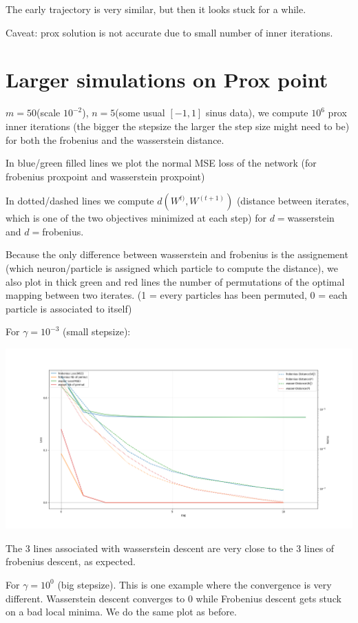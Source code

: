 The early trajectory is very similar, but then it looks stuck for a while.

Caveat: prox solution is not accurate due to small number of inner iterations.

\section{Larger simulations on Prox point}

$m = 50$(scale $10^{-2}$), $n = 5$(some usual $[-1, 1]$ sinus data), we compute $10^6$ prox inner iterations (the bigger the stepsize the larger the step size might need to be) for both the frobenius and the wasserstein distance. 

In blue/green filled lines we plot the normal MSE loss of the network (for frobenius proxpoint and wasserstein proxpoint)

In dotted/dashed lines we compute $d(W^{t)}, W^{(t+1)})$ (distance between iterates, which is one of the two objectives minimized at each step) for $d=$wasserstein and $d=$frobenius.

Because the only difference between wasserstein and frobenius is the assignement (which neuron/particle is assigned which particle to compute the distance), we also plot in thick green and red lines the number of permutations of the optimal mapping between two iterates. (1 = every particles has been permuted, 0 = each particle is associated to itself)

For $\gamma = 10^{-3}$ (small stepsize):

\includegraphics[width=1.0\textwidth]{imgs/petit_pas_10steps.png}

The 3 lines associated with wasserstein descent are very close to the 3 lines of frobenius descent, as expected.

For $\gamma = 10^0$ (big stepsize). This is one example where the convergence is very different. Wasserstein descent converges to 0 while Frobenius descent gets stuck on a bad local minima. We do the same plot as before.

